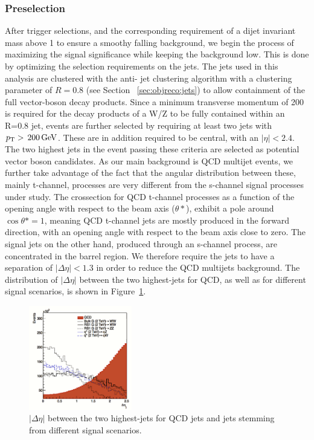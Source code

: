 \subsubsection{Preselection} 
\label{sec:searchI:preselection}
After trigger selections, and the corresponding requirement of a dijet invariant mass above 1 \TeV to ensure a smoothy falling background, we begin the process of maximizing the signal significance while keeping the background low. This is done by optimizing the selection requirements on the jets. The jets used in this analysis are clustered with the anti-\kt{} jet clustering algorithm with a clustering parameter of $R=0.8$ (see Section ~\ref{sec:objreco:jets}) to allow containment of the full vector-boson decay products. Since a minimum transverse momentum of 200 \GeV is required for the decay products of a W/Z to be fully contained within an R=0.8 jet, events are further selected by requiring at least two jets with $p_{\mathrm{T}} > \text{\,200}{\ensuremath{\,\text{Ge\hspace{-.08em}V}}}$. These are in addition required to be central, with an $|\eta| < 2.4$. The two highest \PT jets in the event passing these criteria are selected as potential vector boson candidates. As our main background is QCD multijet events, we further take advantage of the fact that the angular distribution between these, mainly t-channel, processes are very different from the s-channel signal processes under study. The crossection for QCD t-channel processes as a function of the opening angle with respect to the beam axis ($\theta*$), exhibit a pole around $\cos \theta*=1$, meaning QCD t-channel jets are mostly produced in the forward direction, with an opening angle with respect to the beam axis close to zero. The signal jets on the other hand, produced through an s-channel process, are concentrated in the barrel region. We therefore require the jets to have a separation of $|\Delta\eta|<1.3$ in order to reduce the QCD multijets background. The distribution of $|\Delta\eta|$ between the two highest-\PT jets for QCD, as well as for different signal scenarios, is shown in Figure~\ref{fig:searchI:detaopt}.
\begin{figure}[h!]
\centering
\includegraphics[width=0.4\textwidth]{figures/analysis/search1/misc/deta_opt.png}
\caption{ $|\Delta\eta|$  between the two highest-\PT jets for QCD jets and jets stemming from different signal scenarios.}
\label{fig:searchI:detaopt}
\end{figure}
